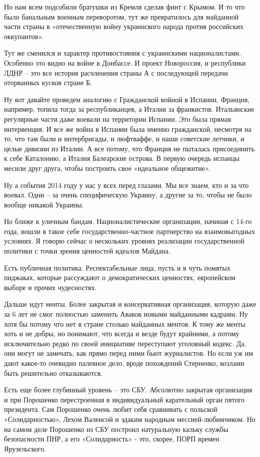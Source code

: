 Но нам всем подсобили братушки из Кремля сделав финт с Крымом. И то что было
банальным военным переворотом, тут же превратилось для майданной части страны в
«отечественную войну украинского народа против российских оккупантов».

Тут же сменился и характер противостояния с украинскими националистами.
Особенно это видно на войне в Донбассе. И проект Новороссия, и республики ЛДНР
– это все история расчленения страны А с последующей передачи оторванных кусков
стране Б.

Ну вот давайте проведем аналогию с Гражданской войной в Испании. Франция,
например, топила тогда за республиканцев, а Италия за франкистов. Итальянские
регулярные части даже воевали на территории Испании. Это была прямая
интервенция. И все же война в Испании была именно гражданской, несмотря на то,
что там были и интербригады, и люфтваффе, и наши советские летчики, и целые
дивизии из Италии. А все потому, что Франция не пыталась присоединить к себе
Каталонию, а Италия Балеарские острова. В первую очередь испанцы месили друг
друга, чтобы построить свое «идеальное общежитие».

Ну а события 2014 году у нас у всех перед глазами. Мы все знаем, кто и за что
воевал. Одни – за очень специфическую Украину, а другие за то, чтобы не было
вообще никакой Украины.

Но ближе к уличным бандам. Националистические организации, начиная с 14-го
года, вошли в такое себе государственно-частное партнерство на взаимовыгодных
условиях. Я говорю сейчас о нескольких уровнях реализации государственной
политики с точки зрения ценностей идеалов Майдана.

Есть публичная политика. Респектабельные лица, пусть и в чуть помятых пиджаках,
которые рассуждают о демократических ценностях, европейском выборе и прочих
чудесностях.

Дальше идут менты. Более закрытая и консервативная организация, которую даже за
6 лет не смог полностью заменить Аваков новыми майданными кадрами. Ну хотя бы
потому что нет в стране столько майданных ментов. К тому же менты хоть и не
добры, но понимают, что всегда и везде будут крайними, а потому исключительно
редко по своей инициативе переступают уголовный кодекс. Да, они могут не
замечать, как прямо перед ними бьют журналистов. Но если уж им дают какое-то
очевидно палевное дело, вроде похождений Стерненко, козлами быть решительно
отказываются.

Есть еще более глубинный уровень – это СБУ. Абсолютно закрытая организация и
при Порошенко перестроенная в индивидуальный карательный орган пятого
президента. Сам Порошенко очень любит себя сравнивать с польской
«Солидарностью», Лехом Валенсой и эдаким народным мессией-любимчиком. Но на
самом деле Порошенко из СБУ построил натуральную кальку службы безопасности
ПНР, а его «Солидарность» - это, скорее, ПОРП времен Ярузельского.

